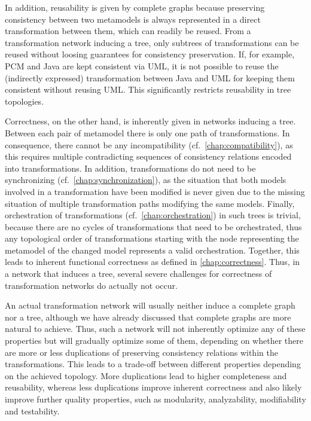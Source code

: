 In addition, reusability is given by complete graphs because preserving consistency between two metamodels is always represented in a direct transformation between them, which can readily be reused.
From a transformation network inducing a tree, only subtrees of transformations can be reused without loosing guarantees for consistency preservation.
If, for example, \gls{PCM} and Java are kept consistent via \gls{UML}, it is not possible to reuse the (indirectly expressed) transformation between Java and \gls{UML} for keeping them consistent without reusing \gls{UML}.
This significantly restricts reusability in tree topologies.

Correctness, on the other hand, is inherently given in networks inducing a tree.
Between each pair of metamodel there is only one path of transformations.
In consequence, there cannot be any incompatibility (cf.\ \autoref{chap:compatibility}), as this requires multiple contradicting sequences of consistency relations encoded into transformations.
In addition, transformations do not need to be synchronizing (cf.\ \autoref{chap:synchronization}), as the situation that both models involved in a transformation have been modified is never given due to the missing situation of multiple transformation paths modifying the same models.
Finally, orchestration of transformations (cf.\ \autoref{chap:orchestration}) in such trees is trivial, because there are no cycles of transformations that need to be orchestrated, thus any topological order of transformations starting with the node representing the metamodel of the changed model represents a valid orchestration.
Together, this leads to inherent functional correctness as defined in \autoref{chap:correctness}.
Thus, in a network that induces a tree, several severe challenges for correctness of transformation networks do actually not occur.

An actual transformation network will usually neither induce a complete graph nor a tree, although we have already discussed that complete graphs are more natural to achieve.
Thus, such a network will not inherently optimize any of these properties but will gradually optimize some of them, depending on whether there are more or less duplications of preserving consistency relations within the transformations.
This leads to a trade-off between different properties depending on the achieved topology.
More duplications lead to higher completeness and reusability, whereas less duplications improve inherent correctness and also likely improve further quality properties, such as modularity, analyzability, modifiability and testability.

